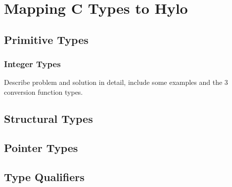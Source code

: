 \section{Mapping C Types to Hylo}

\subsection{Primitive Types}
\subsubsection{Integer Types}
Describe problem and solution in detail, include some examples and the 3 conversion function types.




\subsection{Structural Types}

\subsection{Pointer Types}

\subsection{Type Qualifiers}

